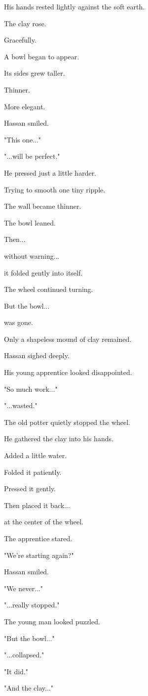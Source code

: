 \documentclass[12pt,openany]{book}
\begin{document}
His hands rested lightly against the soft earth.

The clay rose.

Gracefully.

A bowl began to appear.

Its sides grew taller.

Thinner.

More elegant.

Hassan smiled.

"This one..."

"...will be perfect."

He pressed just a little harder.

Trying to smooth one tiny ripple.

The wall became thinner.

The bowl leaned.

Then...

without warning...

it folded gently into itself.

The wheel continued turning.

But the bowl...

was gone.

Only a shapeless mound of clay remained.

Hassan sighed deeply.

His young apprentice looked disappointed.

"So much work..."

"...wasted."

The old potter quietly stopped the wheel.

He gathered the clay into his hands.

Added a little water.

Folded it patiently.

Pressed it gently.

Then placed it back...

at the center of the wheel.

The apprentice stared.

"We're starting again?"

Hassan smiled.

"We never..."

"...really stopped."

The young man looked puzzled.

"But the bowl..."

"...collapsed."

"It did."

"And the clay..."
\end{document}
